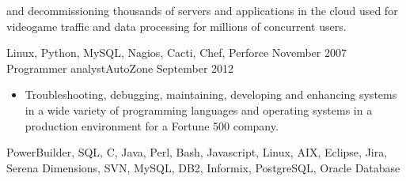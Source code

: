 \begin{experiences}
{\begin{itemize}
                        and decommissioning thousands of servers and 
                        applications in the cloud used for videogame traffic 
                        and data processing for millions of concurrent users.
                      \end{itemize}
                  }
                  {Linux, Python, MySQL, Nagios, Cacti, Chef, Perforce}
  \emptySeparator
  \experience
  {November 2007}  {Programmer analyst}{AutoZone}
  {September 2012}   {
                      \begin{itemize}
                        \item Troubleshooting, debugging, maintaining, 
                        developing and enhancing systems in a wide variety of 
                        programming languages and operating systems in a 
                        production environment for a Fortune 500 company.
                      \end{itemize}
                  }
                  {PowerBuilder, SQL, C, Java, Perl, Bash, Javascript, Linux, 
                  AIX, Eclipse, Jira, Serena Dimensions, SVN, MySQL, DB2, 
                  Informix, PostgreSQL, Oracle Database}
\end{experiences}
